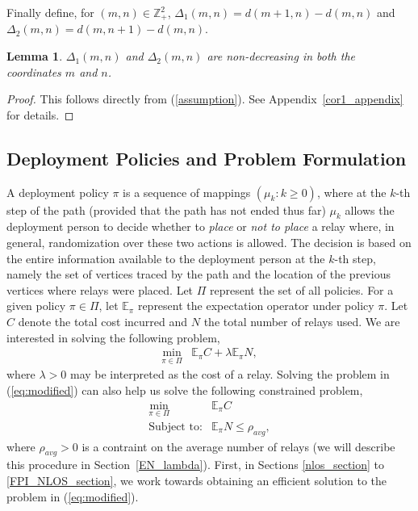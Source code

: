 \documentclass[conference]{IEEEtran}
\newtheorem{lemma}{Lemma}
\begin{document}
Finally define, for $(m,n)\in\mathbb{Z}_+^2$, $\Delta_1(m,n)=d(m+1,n)-d(m,n)$ and 
$\Delta_2(m,n)=d(m,n+1)-d(m,n)$. 
\begin{lemma}
\label{cor1}
$\Delta_1(m,n)$ and $\Delta_2(m,n)$ are 
non-decreasing in both the coordinates $m$ and $n$. 
\end{lemma}
\begin{proof}
  This follows directly from (\ref{assumption}). See
  Appendix~\ref{cor1_appendix} for details.
\end{proof}


\subsection{Deployment Policies and Problem Formulation}
A deployment policy $\pi$ is a sequence of mappings $(\mu_k:k\ge0)$,
where at the $k$-th step of the path (provided that the path has not
ended thus far) $\mu_k$ allows the deployment person to decide whether
to \emph{place} or \emph{not to place} a relay where, in general,
randomization over these two actions is allowed. The decision is based
on the entire information available to the deployment person at the
$k$-th step, namely the set of vertices traced by the path and the
location of the previous vertices where relays were placed.  Let $\Pi$
represent the set of all policies. For a given policy $\pi \in \Pi$,
let $\mathbb{E}_\pi$ represent the expectation operator under policy
$\pi$. Let $C$ denote the total cost incurred and $N$ the total number
of relays used. We are interested in solving the following problem,
\begin{eqnarray}
\label{eq:modified} 
\min_{\pi \in \Pi} & \mathbb{E}_{\pi}C+\lambda \mathbb{E}_{\pi}N,
\end{eqnarray}
where $\lambda>0$ may be interpreted as the cost of a relay.  Solving
the problem in (\ref{eq:modified}) can also help us solve the
following constrained problem,
\begin{eqnarray}
\label{eq:main}
\min_{\pi \in \Pi} & \mathbb{E}_{\pi}C \nonumber \\
\mbox{Subject to:} & \mathbb{E}_{\pi}N\leq \rho_{avg},
\end{eqnarray}
where $\rho_{avg}>0$ is a contraint on the average number of relays
(we will describe this procedure in Section~\ref{EN_lambda}).
First, in Sections \ref{nlos_section} to \ref{FPI_NLOS_section},
we work towards obtaining an efficient solution to the problem in (\ref{eq:modified}).
\end{document}

